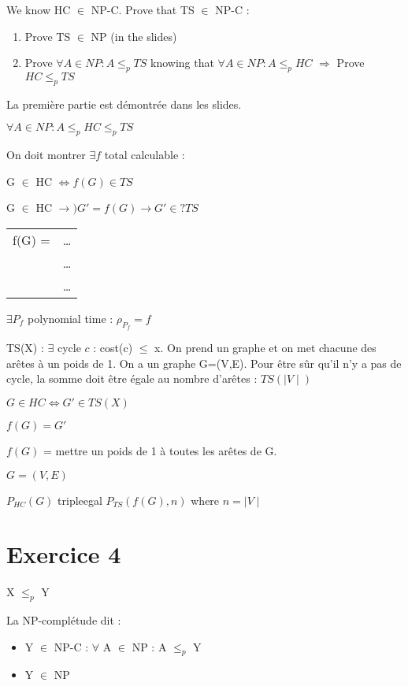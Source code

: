 \documentclass[a4paper, 12pt]{article}
\begin{document}
We know HC $\in$ NP-C. Prove that TS $\in$ NP-C :

\begin{enumerate}
    \item Prove TS $\in$ NP (in the slides)
    \item Prove $\forall A \in NP : A \leq_{p} TS$ knowing that $\forall
        A \in NP : A \leq_{p} HC $
        \subitem $\Rightarrow$ Prove $HC \leq_{p} TS$
\end{enumerate}

La première partie est démontrée dans les slides.

$\forall A \in NP : A \leq_{p} HC \leq_{p} TS$ 

On doit montrer $\exists f$ total calculable :

G $\in$ HC $\Leftrightarrow f(G) \in TS$

G $\in$ HC $\rightarrow) G' = f(G) \rightarrow G' \in? TS$ 

\begin{tabular}{ll}
    f(G) = & \dots\\
    & \dots \\
    & \dots \\
\end{tabular}

$\exists P_{f}$ polynomial time : $\rho_{P_{f}} = f$

TS(X) : $\exists$ cycle $c$ : cost(c) $\leq$ x. On prend un graphe et on
met chacune des arêtes à un poids de 1. On a un graphe G=(V,E). Pour être
sûr qu'il n'y a pas de cycle, la somme doit être égale au nombre
d'arêtes : $TS(\mid V\mid)$

$G \in HC \Leftrightarrow G' \in TS(X)$

$f(G) = G'$

$f(G)$ = mettre un poids de 1 à toutes les arêtes de G.

$G=(V,E)$

$P_{HC}(G)$ tripleegal $P_{TS}(f(G), n)$ where $n = \mid V\mid$ 

\section{Exercice 4}

X $\leq_{p}$ Y

La NP-complétude dit : 

\begin{itemize}
    \item Y $\in$ NP-C : $\forall$ A $\in$ NP : A $\leq_{p}$ Y
    \item Y $\in$ NP
\end{itemize}
\end{document}

